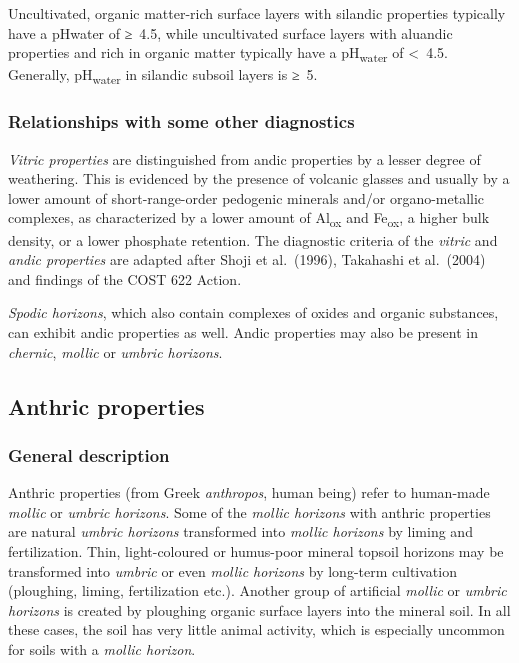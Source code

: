 \documentclass[
  letterpaper,
  DIV=11,
  numbers=noendperiod]{scrreprt}
\begin{document}
Uncultivated, organic matter-rich surface layers with silandic
properties typically have a pHwater of ≥~4.5, while uncultivated surface
layers with aluandic properties and rich in organic matter typically
have a pH\textsubscript{water} of \textless~4.5. Generally,
pH\textsubscript{water} in silandic subsoil layers is ≥~5.

\hypertarget{relationships-with-some-other-diagnostics-40}{%
\subsubsection{Relationships with some other
diagnostics}\label{relationships-with-some-other-diagnostics-40}}

\emph{Vitric properties} are distinguished from andic properties by a
lesser degree of weathering. This is evidenced by the presence of
volcanic glasses and usually by a lower amount of short-range-order
pedogenic minerals and/or organo-metallic complexes, as characterized by
a lower amount of Al\textsubscript{ox} and Fe\textsubscript{ox}, a
higher bulk density, or a lower phosphate retention. The diagnostic
criteria of the \emph{vitric} and \emph{andic properties} are adapted
after Shoji et al.~(1996), Takahashi et al.~(2004) and findings of the
COST 622 Action.

\emph{Spodic horizons}, which also contain complexes of oxides and
organic substances, can exhibit andic properties as well. Andic
properties may also be present in \emph{chernic}, \emph{mollic} or
\emph{umbric horizons}.

\hypertarget{anthric-properties}{%
\subsection{Anthric properties}\label{anthric-properties}}

\hypertarget{general-description-43}{%
\subsubsection{General description}\label{general-description-43}}

Anthric properties (from Greek \emph{anthropos}, human being) refer to
human-made \emph{mollic} or \emph{umbric horizons}. Some of the
\emph{mollic horizons} with anthric properties are natural \emph{umbric
horizons} transformed into \emph{mollic horizons} by liming and
fertilization. Thin, light-coloured or humus-poor mineral topsoil
horizons may be transformed into \emph{umbric} or even \emph{mollic
horizons} by long-term cultivation (ploughing, liming, fertilization
etc.). Another group of artificial \emph{mollic} or \emph{umbric
horizons} is created by ploughing organic surface layers into the
mineral soil. In all these cases, the soil has very little animal
activity, which is especially uncommon for soils with a \emph{mollic
horizon}.
\end{document}
